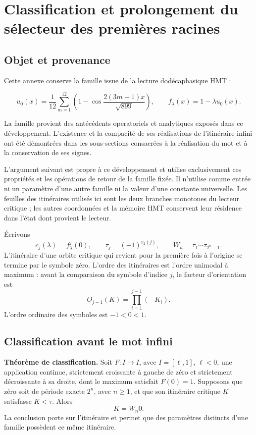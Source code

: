 \section{Classification et prolongement du sélecteur des premières racines}
\label{hmtfg:fragmento:clasificacion-y-continuacion-del-selector-de-primeras-raices}

\subsection{Objet et provenance}
\label{hmtfg:clasificacion:1}

Cette annexe conserve la famille issue de la lecture dodécaphasique HMT :

\[
u_0(x)=\frac1{12}\sum_{m=1}^{12}\left(1-\cos\frac{2(3m-1)x}{\sqrt{899}}\right),
\qquad f_\lambda(x)=1-\lambda u_0(x).
\]

La famille provient des antécédents operatoriels et analytiques exposés dans ce développement. L’existence et la compacité de ses réalisations de l’itinéraire infini ont été démontrées dans les sous-sections consacrées à la réalisation du mot et à la conservation de ses signes.

L’argument suivant est propre à ce développement et utilise exclusivement ces propriétés et les opérations de retour de la famille fixée. Il n’utilise comme entrée ni un paramètre d’une autre famille ni la valeur d’une constante universelle. Les feuilles des itinéraires utilisés ici sont les deux branches monotones du lecteur critique ; les autres coordonnées et la mémoire HMT conservent leur résidence dans l’état dont provient le lecteur.

Écrivons
\[
c_j(\lambda)=f_\lambda^j(0),\qquad
\tau_j=(-1)^{v_2(j)},\qquad
W_n=\tau_1\cdots\tau_{2^n-1}.
\]
L’itinéraire d’une orbite critique qui revient pour la première fois à l’origine se termine par le symbole zéro. L’ordre des itinéraires est l’ordre unimodal à maximum : avant la comparaison du symbole d’indice \(j\), le facteur d’orientation est
\[
O_{j-1}(K)=\prod_{i=1}^{j-1}(-K_i).
\]
L’ordre ordinaire des symboles est \(-1<0<1\).


\subsection{Classification avant le mot infini}
\label{hmtfg:clasificacion:2}

\textbf{Théorème de classification.} Soit \(F:I\to I\), avec \(I=[\ell,1]\), \(\ell<0\), une application continue, strictement croissante à gauche de zéro et strictement décroissante à sa droite, dont le maximum satisfait \(F(0)=1\). Supposons que zéro soit de période exacte \(2^n\), avec \(n\ge1\), et que son itinéraire critique \(K\) satisfasse \(K<\tau\). Alors
\[
\boxed{K=W_n0.}
\]
La conclusion porte sur l’itinéraire et permet que des paramètres distincts d’une famille possèdent ce même itinéraire.

